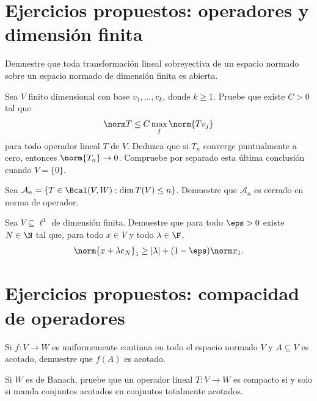 \section{Ejercicios propuestos: operadores y dimensión finita}\label{sec:nuevo09:ejercicios-finito}

\begin{ejercicio}\label{ej:lectura-22-1}
Demuestre que toda transformación lineal sobreyectiva de un espacio normado sobre un espacio normado de dimensión finita es abierta.
\end{ejercicio}


\begin{ejercicio}\label{ej:lectura-22-2}
Sea $V$ finito dimensional con base $v_1,\ldots,v_k$, donde $k\geq1$. Pruebe que existe $C>0$ tal que
\[
 \norm T\leq C\max_j\norm{Tv_j}
\]
para todo operador lineal $T$ de $V$. Deduzca que si $T_n$ converge puntualmente a cero, entonces $\norm{T_n}\to0$. Compruebe por separado esta última conclusión cuando $V=\{0\}$.
\end{ejercicio}


\begin{ejercicio}\label{ej:lectura-22-3}
Sea $\mathcal A_n=\{T\in\Bcal(V,W):\dim T(V)\leq n\}$. Demuestre que $\mathcal A_n$ es cerrado en norma de operador.
\end{ejercicio}


\begin{ejercicio}\label{ej:lectura-22-6}
Sea $V\subseteq\ell^1$ de dimensión finita. Demuestre que para todo $\eps>0$ existe $N\in\N$ tal que, para todo $x\in V$ y todo $\lambda\in\F$,
\[
 \norm{x+\lambda e_N}_1\geq|\lambda|+(1-\eps)\norm x_1.
\]
\end{ejercicio}


\section{Ejercicios propuestos: compacidad de operadores}

\begin{ejercicio}\label{ej:lectura-23-1}
Si $f:V\to W$ es uniformemente continua en todo el espacio normado $V$ y $A\subseteq V$ es acotado, demuestre que $f(A)$ es acotado.
\end{ejercicio}


\begin{ejercicio}\label{ej:lectura-23-2}
Si $W$ es de Banach, pruebe que un operador lineal $T:V\to W$ es compacto si y solo si manda conjuntos acotados en conjuntos totalmente acotados.
\end{ejercicio}



